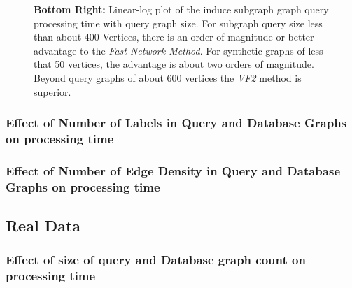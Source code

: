 \begin{figure}[H]
{\textbf{Bottom Right:} Linear-log plot of the induce subgraph graph query processing time with query graph size. For subgraph query size less than about 400 Vertices, there is an order of magnitude or better advantage to the \textit{Fast Network Method}. For synthetic graphs of less that 50 vertices, the advantage is about two orders of magnitude. Beyond query graphs of about 600 vertices the \textit{VF2} method is superior.
}
\label{fig:fig91}
\end{figure}


\subsubsection{Effect of Number of Labels in Query and Database Graphs on processing time}

\subsubsection{Effect of Number of Edge Density in Query and Database Graphs on processing time}

\subsection{Real Data}

\subsubsection{Effect of size of query and Database graph count on processing time}

